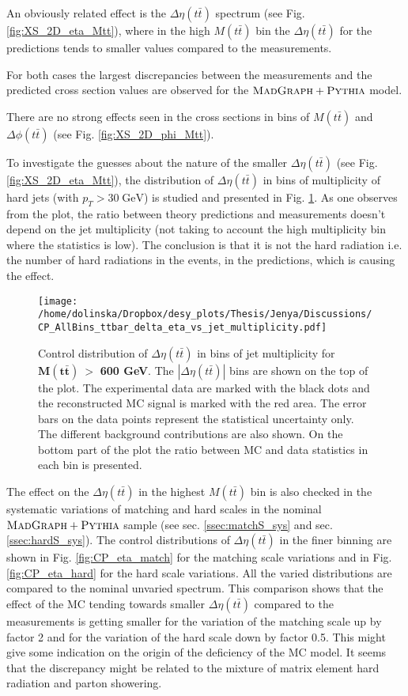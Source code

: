 An obviously related effect is the $\Delta\eta(t\bar{t})$ spectrum (see Fig. \ref{fig:XS_2D_eta_Mtt}),
where in the high $M(t\bar{t})$ bin the $\Delta\eta(t\bar{t})$ for the predictions tends to smaller values compared to the measurements.

For both cases the largest discrepancies between the measurements and the predicted cross section values are observed for the $\textsc{MadGraph}+\textsc{Pythia}$
model.

There are no strong effects seen in the cross sections in bins of $M(t\bar{t})$ and $\Delta\phi(t\bar{t})$ (see Fig. \ref{fig:XS_2D_phi_Mtt}).

To investigate the guesses about the nature of the smaller $\Delta\eta(t\bar{t})$ (see Fig. \ref{fig:XS_2D_eta_Mtt}),
the distribution of $\Delta\eta(t\bar{t})$ in bins of multiplicity of hard jets (with $p_{T} > 30\;\text{GeV}$) is studied and presented
in Fig. \ref{fig:eta_jetMult}. As one observes from the plot, the ratio between theory predictions and measurements doesn't depend
on the jet multiplicity (not taking to account the high multiplicity bin where the statistics is low). The conclusion is that it
is not the hard radiation i.e. the number of hard radiations in the events, in the predictions, which is causing the effect. 

\begin{figure}[t]
  \centering
  \texttt{[image: /home/dolinska/Dropbox/desy\_plots/Thesis/Jenya/Discussions/CP\_AllBins\_ttbar\_delta\_eta\_vs\_jet\_multiplicity.pdf]}
  \caption{Control distribution of $\Delta\eta({t\bar{t}})$ in bins of jet multiplicity for $\mathbf{M(t\bar{t})\: >}$ \textbf{600 GeV}. The $|\Delta\eta(t\bar{t})|$ 
  bins are shown on the top of the plot. The experimental data are marked with the black dots and the reconstructed MC signal is marked with the red area. The error
  bars on the data points represent the statistical uncertainty only. The 
  different background contributions are also shown. On the bottom part of the plot the ratio between MC and data statistics in each bin
  is presented.}
  \label{fig:eta_jetMult}
\end{figure}

The effect on the $\Delta\eta(t\bar{t})$ in the highest $M(t\bar{t})$ bin is also checked in the systematic variations of matching and hard scales in the nominal $\textsc{MadGraph}+\textsc{Pythia}$ sample 
(see sec. \ref{ssec:matchS_sys} and sec. \ref{ssec:hardS_sys}). The control distributions of $\Delta\eta(t\bar{t})$ in the finer binning are shown 
in Fig. \ref{fig:CP_eta_match} for the matching scale variations and in Fig. \ref{fig:CP_eta_hard} for the hard scale variations. All the varied 
distributions are compared to the nominal unvaried spectrum. This comparison shows that the effect of the MC tending towards smaller $\Delta\eta(t\bar{t})$
compared to the measurements is getting smaller for the variation of the matching scale up by factor 2 and for the variation of the hard scale down 
by factor 0.5. This might give some indication on the origin of the deficiency of the MC model. It seems that the discrepancy might be related to the 
mixture of matrix element hard radiation and parton showering.

